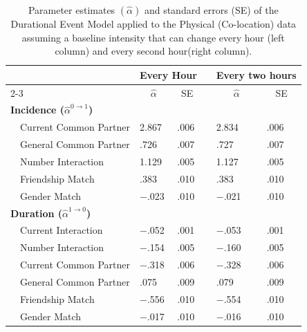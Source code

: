 \begin{table}[t!]
\caption{Parameter estimates $(\hat{\alpha})$ and standard errors (SE) of the Durational Event Model applied to the Physical (Co-location) data assuming a baseline intensity that can change every hour (left column) and every second hour(right column). \label{tbl:results_sens_proximity}} 
\begin{center}
\begin{tabular}{lllcll}
\hline
\multicolumn{1}{l}{\bfseries }&\multicolumn{2}{c}{\bfseries Every Hour}&\multicolumn{1}{l}{\bfseries }&\multicolumn{2}{c}{\bfseries Every two hours}\tabularnewline
\cline{2-3} \cline{5-6}
\multicolumn{1}{l}{}&\multicolumn{1}{c}{$\hat{\alpha}$}&\multicolumn{1}{c}{SE}&\multicolumn{1}{c}{}&\multicolumn{1}{c}{$\hat{\alpha}$}&\multicolumn{1}{c}{SE}\tabularnewline
\hline
{\bfseries Incidence ($\hat \alpha^{0\rightarrow 1}$)}&&&&&\tabularnewline
~~Current Common Partner&2.867&.006&&2.834&.006\tabularnewline
~~General Common Partner&.726&.007&&.727&.007\tabularnewline
~~Number Interaction&1.129&.005&&1.127&.005\tabularnewline
~~Friendship Match&.383&.010&&.383&.010\tabularnewline
~~Gender Match&$-$.023&.010&&$-$.021&.010\tabularnewline
\hline
{\bfseries Duration ($\hat \alpha^{1\rightarrow 0}$)}&&&&&\tabularnewline
~~Current Interaction&$-$.052&.001&&$-$.053&.001\tabularnewline
~~Number Interaction&$-$.154&.005&&$-$.160&.005\tabularnewline
~~Current Common Partner&$-$.318&.006&&$-$.328&.006\tabularnewline
~~General Common Partner&.075&.009&&.079&.009\tabularnewline
~~Friendship Match&$-$.556&.010&&$-$.554&.010\tabularnewline
~~Gender Match&$-$.017&.010&&$-$.016&.010\tabularnewline
\hline
\end{tabular}\end{center}
\end{table}
